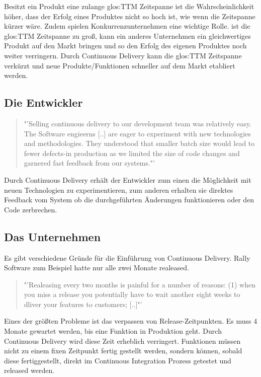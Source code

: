 Besitzt ein Produkt eine zulange \gls{glos:TTM} Zeitspanne ist die Wahrscheinlichkeit höher, dass der Erfolg eines Produktes nicht so hoch ist, wie wenn die Zeitspanne kürzer wäre. Zudem spielen Konkurrenzunternehmen eine wichtige Rolle. ist die \gls{glos:TTM} Zeitspanne zu groß, kann ein anderes Unternehmen ein gleichwertiges Produkt auf den Markt bringen und so den Erfolg des eigenen Produktes noch weiter verringern. Durch Continuous Delivery kann die \gls{glos:TTM} Zeitspanne verkürzt und neue Produkte/Funktionen schneller auf dem Markt etabliert werden.

\subsection{Die Entwickler}
\label{subsec:DieEntwickler}
\begin{quote}
	"'Selling continuous delivery to our development team was relatively easy. The Software engieerns [..] are eager to experiment with new technologies and methodologies. They understood that smaller batch size would lead to fewer defects-in production as we limited the size of code changes and garnered fast feedback from our systems."' \cite{RallySofware2013}
\end{quote}
Durch Continuous Delivery erhält der Entwickler zum einen die Möglichkeit mit neuen Technologien zu experimentieren, zum anderen erhalten sie direktes Feedback vom System ob die durchgeführten Änderungen funktionieren oder den Code zerbrechen.

\subsection{Das Unternehmen}
\label{subsec:DasUnternehmen}
Es gibt verschiedene Gründe für die Einführung von Continuous Delivery. Rally Software zum Beispiel hatte nur alle zwei Monate realeased. 

\begin{quote}
	"'Realeasing every two months is painful for a number of reasons: (1) when you miss a release you potentially have to wait another eight weeks to dliver your features to customers; [..]"'\cite{RallySofware2013}
\end{quote}
Eines der größten Probleme ist das verpassen von Release-Zeitpunkten. Es muss 4 Monate gewartet werden, bis eine Funktion in Produktion geht. Durch Continuous Delivery wird diese Zeit erheblich verringert. Funktionen müssen nicht zu einem fixen Zeitpunkt fertig gestellt werden, sondern können, sobald diese fertiggestellt, direkt im Continuous Integration Prozess getestet und released werden.

